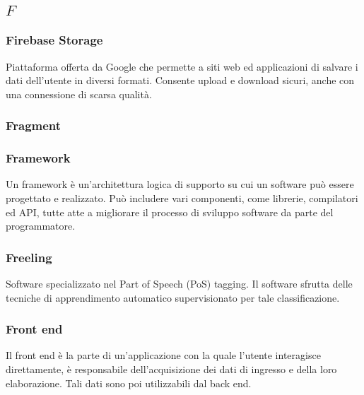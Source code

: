 \subsection*{\quad$F\quad$}
\subsubsection*{Firebase Storage}
Piattaforma offerta da Google che permette a siti web ed applicazioni di salvare i dati dell'utente in diversi formati. Consente upload e download sicuri, anche con una connessione di scarsa qualità.

\subsubsection*{Fragment}

\subsubsection*{Framework}
Un framework è un'architettura logica di supporto su cui un software può essere progettato e realizzato. Può includere vari componenti, come librerie, compilatori ed API\glo, tutte atte a migliorare il processo di sviluppo software da parte del programmatore.

\subsubsection*{Freeling}
Software specializzato nel Part of Speech (PoS) tagging\glo. Il software sfrutta delle tecniche di apprendimento automatico supervisionato per tale classificazione.  

\subsubsection*{Front end}
Il front end è la parte di un'applicazione con la quale l'utente interagisce direttamente, è responsabile dell'acquisizione dei dati di ingresso e della loro elaborazione. Tali dati sono poi utilizzabili dal back end\glo. 


